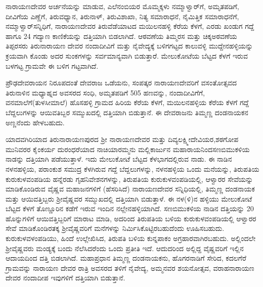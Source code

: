 ನಾರಾಯಣದೇವರ ಅರ್ಚನೆಯನ್ನು ಮಾಡುವ, ಎಲೆನಂಬಿಯರ ಮೊಮ್ಮಕ್ಕಳು ನಮ್ಮಾಳ್ವಾರ್​ಗೆ, ಅಮೃತಪಡಿಗೆ, ದೀವಿಗೆಯ ಎಣ್ಣೆಗೆ, ತಿರುವಧ್ಯಾನ, ತಿರುನಾಳ್​, ತಿರುವಿಶಾಖಾ, ನಿತ್ಯ ಸಮಾರಾಧನೆ, ನೈಮಿತ್ತಿಕ ಸಮಾರಾಧನೆಗೆ, ನಮ್ಮಾಳ್ವಾರ್​ ಸನ್ನಿಧಿಗೆ, ನಾರಾಯಣದೇವರ ತಿರುವೆಡೆಯಾಟದ ಮಯಿಲನಹಳ್ಳಿ ಕೆರೆಯ ಕೆಳಗೆ, ಎರಡು ಖಂಡುಗ ಗದ್ದೆ ಹಾಗೂ 24 ಗದ್ಯಾಣ ಕಾಣಿಕೆಯನ್ನು ದತ್ತಿಯಾಗಿ ಬಿಡಲಾಗಿದೆ. ಆಠವಣೆಯ ತಿಮ್ಮರಸ ಮತ್ತು ಚಿಕ್ಕಅಠವಣೆಯ ತಿಪ್ಪರಸರು ತಿರುನಾರಾಯಣ ದೇವರ ನಂದಾದೀವಿಗೆ ಮತ್ತು ನೈವೇದ್ಯಕ್ಕೆ ಬಳಿಗಗಟ್ಟದ ಕಾಲುವಳ್ಳಿ ಮುದ್ದೇನಹಳ್ಳಿಯನ್ನು ಕ್ರಯವಾಗಿ ಕೊಂಡು ಅದರ ಸುಂಕಗಳನ್ನು ಸರ್ವಮಾನ್ಯವಾಗಿ ಬಿಡುತ್ತಾರೆ. ಮೇಲುಕೋಟೆಯ ಬೆಟ್ಟದ ಕೆಳಗೆ ಇರುವ ಬಳಗಟ್ಟ ಗ್ರಾಮವೇ ಈ ಬಳಿಗ ಗಟ್ಟವಾಗಿದೆ.

ಪ್ರೌಢದೇವರಾಯನ ನಿರೂಪದಂತೆ ದೇವರಾಜ ಒಡೆಯನು, ಸಂಪತ್ಕರ ನಾರಾಯಣದೇವರಿಗೆ ವಸಂತೋತ್ಸವದ ತಿರುನಾಳಿನ ಮಧ್ಯಾಹ್ನದ ಅವಸರದ ಸಂಧಿ, ಅಮೃತಪಡಿಗೆ 505 ಹಣವನ್ನು, ನಂದಾದೀವಿಗೆಗೆ, ವನಮಾಲೆಗೆ(ತುಳಸೀಮಾಲೆ) ಹೊಸಹಳ್ಳಿ ಗ್ರಾಮದ ಹಿರಿಯ ಕೆರೆಯ ಕೆಳಗೆ, ಮಯಿಲನಹಳ್ಳಿಯ ಕೆರೆಯ ಕೆಳಗೆ ಗದ್ದೆ ಬೆದ್ದಲುಗಳನ್ನು ಆಯಿವತಿಬ್ಬರ ಸಮ್ಮುಖದಲ್ಲಿ ದತ್ತಿಯಾಗಿ ಬಿಡುತ್ತಾನೆ. ಈ ದೇವರಾಜನು ತಿಮ್ಮಣ್ಣ ದಂಡನಾಯಕನ ಅಣ್ಣನೆಂದು ಹೇಳಬಹುದು.

ಯಾದವಗಿರಿಯಾದ ತಿರುನಾರಾಯಣಪುರದ ಶ‍್ರೀ ನಾರಾಯಣದೇವರ ಮತ್ತು ದಿವ್ಯಲಕ್ಷ್ಮೀದೇವಿಯರ,\break ಶಠಗೋಪ ಮುನಿವರರ ಕೈಂಕರ್ಯ ದುರಂಧರೆಯಾದ ನಾಚಿಯಾರಮ್ಮನು ಮಲ್ಲಿಕಾರ್ಜುನ ಮಹಾರಾಯನಿಂದ\break ಸಣಬಿಮುಕಳಿಯ ನಾಡನ್ನು ದತ್ತಿಯಾಗಿ ಪಡೆಯುತ್ತಾಳೆ. ಇದು ಮೇಲುಕೋಟೆ ಬೆಟ್ಟದ ಕೆಳಭಾಗದಲ್ಲಿರುವ ನಾಡು. ಈ ನಾಡಿನ ನಳನಹಳ್ಳಿಯ, ಪರಾಂಕುಶ ಸಮುದ್ರ ಕೆಳಗಿರುವ ಗದ್ದೆ ಬೆದ್ದಲುಗಳನ್ನು, ನಳನಹಳ್ಳಿಯ ಒಂದು ಮನೆಯನ್ನು, ತಿರುಪತಿಯ ಕುರುಕುಳವಂಪಡಿಯ ಹನ್ನೆರಡು ಗೃಹನಿವೇಶನಗಳನ್ನು, ತಿರುಪತಿಯ ಕುರುಕುಳವಂಪಡಿಯಲ್ಲಿ, ಆಳ್ವಾರರ ಸೇವೆಯನ್ನು ಮಾಡಿಕೊಂಡಿರುವ ವೈಷ್ಣವ ಮಹಾಜನಗಳಿಗೆ (ಹೆಸರಿಸಿದೆ) ನಾರಾಯಣದೇವರ ಸನ್ನಿಧಿಯಲ್ಲಿ, ತಿಮ್ಮಣ್ಣ ದಂಡನಾಯಕ ಮತ್ತು ಆಯಿವತ್ತಿಬ್ಬರು ಶ‍್ರೀವೈಷ್ಣವರ ಸಮ್ಮುಖದಲ್ಲಿ ದತ್ತಿಯಾಗಿ ಬಿಡುತ್ತಾಳೆ. ಈ ನಳ(ಳಿ)ನ ಹಳ್ಳಿಯು ಮೇಲುಕೋಟೆ ಬೆಟ್ಟದ ಕೆಳಗೆ ತೊಣ್ಣೂರಿನ ಕಡೆಗೆ ಇರುವ ಇಂದಿನ ನಲ್ಲೇನಹಳ್ಳಿಯಾಗಿದೆ. ಸಣಬಿಮುಕಳಿಯ ನಾಡಿನ ದತ್ತಿಯನ್ನು 20 ಹೊನ್ನುಗಳಿಗೆ ಆಯಿವತ್ತಿಬ್ಬರಿಗೆ ಮಾರಾಟ ಮಾಡಿ, ಅದರಿಂದ ತಿರುಪತಿಯ ಬಳಿಯ ಕುರುಕುಳವಂಪಡಿಯಲ್ಲಿ ಆಳ್ವಾರರ ಸೇವೆ ಮಾಡಿಕೊಂಡಿರತಕ್ಕ ಶ‍್ರೀವೈಷ್ಣವರಿಗೆ ಮನೆಗಳನ್ನು ನಿರ್ಮಿಸಿಕೊಟ್ಟಿರಬಹುದೆಂದು ಊಹಿಸಬಹುದು. ಕುರುಕುಳವಳಂಪಡಿಯು, ಹಿಂದೆ ಉಲ್ಲೇಖಿಸಿದ, ತಿರುಪತಿ ಬಳಿಯ ಕುನ್ನಪಾಕಂ ಅಗ್ರಹಾರವಾಗಿರಬಹುದು. ಅಲ್ಲಿಂದಲೇ ಶ‍್ರೀವೈಷ್ಣವರು ಮಂಡ್ಯಕ್ಕೆ ಬಂದು ನೆಲೆಸಿದರೆಂದು ಒಂದು ಪ್ರತೀತಿ ಇದೆ. ಆದುದರಿಂದ ಅಲ್ಲಿದ್ದ ವೈಷ್ಣವರಿಗೆ ಇಲ್ಲಿನ ಆದಾಯದಿಂದ ದತ್ತಿ ಬಿಡಲಾಗಿದೆ. ಮಹಾಪ್ರಧಾನ ತಿಮ್ಮಣ್ಣ ದಂಡನಾಯಕನು, ಹೊಗರನಾಡಿಗೆ ಸೇರಿದ, ಕದಲಗೆರೆ ಗ್ರಾಮವನ್ನು ನಾರಾಯಣ ದೇವರ ರಾತ್ರಿ ಅವಸರದ ತಳಿಗೆ ನೈವೇದ್ಯ, ಅಮ್ಮನವರ ಶಯನೋತ್ಸವ, ವರಾಹನಾರಾಯಣ ದೇವರ ನಂದಾದೀಪ ಇವುಗಳಿಗೆ ದತ್ತಿಯಾಗಿ ಬಿಡುತ್ತಾನೆ.

